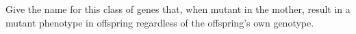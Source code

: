 \mult

Give the name for this class of genes that,
when mutant in the
mother,
result in a mutant phenotype in offspring regardless of the offspring's own
genotype.


